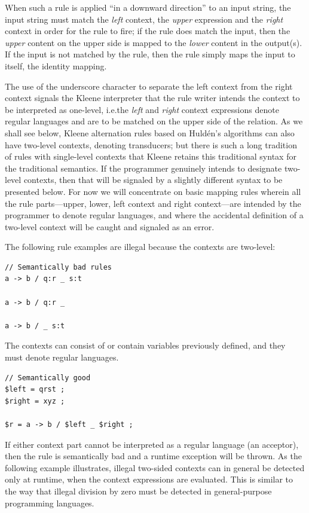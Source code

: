 \noindent
When such a rule is applied ``in a downward direction'' to an input string, the input string must match the \emph{left}
context, the \emph{upper} expression and the \emph{right} context in order for the rule to fire; if the rule does match the input, then the
\emph{upper} content on the upper side is mapped to the \emph{lower} content in the output(s).  If the
input is not matched by the rule, then the rule simply maps the input to itself, the identity mapping.


The use of the underscore character to separate the left context from the right context signals the
Kleene interpreter that the rule writer intends the context to be interpreted as one-level, i.e.\@ the
\emph{left} and \emph{right} context expressions denote regular languages and are to be matched on the upper
side of the relation.  As we shall see below, Kleene alternation rules based on Huldén's algorithms can
also have two-level contexts, denoting transducers; but there is such a long tradition of rules with
single-level contexts that Kleene retains this traditional syntax for the traditional semantics.  If
the programmer genuinely intends to designate two-level contexts, then that will be signaled by a
slightly different syntax to be presented below.  For now we will concentrate on basic mapping rules
wherein all the rule parts---upper, lower, left context and right context---are intended
by the programmer
to denote regular languages, and where the accidental definition of a two-level context will be caught
and signaled as an error.

The following rule examples are illegal because the contexts are two-level:

\begin{Verbatim}
// Semantically bad rules
a -> b / q:r _ s:t

a -> b / q:r _

a -> b / _ s:t
\end{Verbatim}

\noindent
The contexts can consist of or contain variables previously defined, and they must denote regular languages.


\begin{Verbatim}
// Semantically good
$left = qrst ;
$right = xyz ;

$r = a -> b / $left _ $right ;
\end{Verbatim}

\noindent
If either context part cannot be interpreted as a regular language (an acceptor), then the rule is semantically bad and
a runtime exception will be thrown.  As the following example illustrates, illegal two-sided contexts can in general be detected
only at runtime, when the context expressions are evaluated.  This is similar to the way that illegal division by zero
must be detected in general-purpose programming languages.

